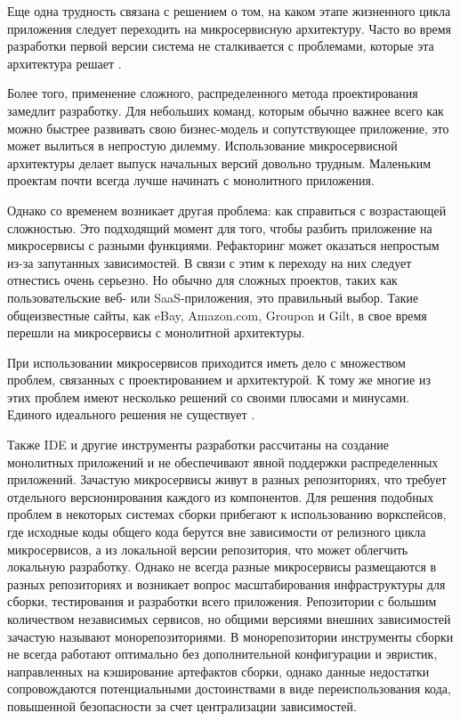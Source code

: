 Еще одна трудность связана с решением о том, на каком этапе жизненного цикла
приложения следует переходить на микросервисную архитектуру. Часто во время
разработки первой версии система не сталкивается с проблемами, которые эта
архитектура решает \cite{kaban}. 

Более того, применение сложного, распределенного метода
проектирования замедлит разработку. Для небольших команд, которым обычно важнее всего
как можно быстрее развивать свою бизнес-модель и сопутствующее приложение, это
может вылиться в непростую дилемму. Использование микросервисной архитектуры делает выпуск начальных версий довольно трудным. Маленьким проектам почти всегда
лучше начинать с монолитного приложения.

Однако со временем возникает другая проблема: как справиться с возрастающей сложностью. Это подходящий момент для того, чтобы разбить приложение
на микросервисы с разными функциями. Рефакторинг может оказаться непростым
из-за запутанных зависимостей. В связи с этим к переходу на них следует отнестись очень серьезно. Но обычно для сложных проектов, таких как пользовательские веб- или
SaaS-приложения, это правильный выбор. Такие общеизвестные сайты, как eBay, Amazon.com, Groupon и Gilt, в свое время перешли на микросервисы с монолитной архитектуры.

При использовании микросервисов приходится иметь дело с множеством проблем, связанных с проектированием и архитектурой.
К тому же многие из этих
проблем имеют несколько решений со своими плюсами и минусами. Единого
идеального решения не существует \cite{micro-1}.

Также IDE и другие инструменты разработки рассчитаны на создание монолитных
приложений и не обеспечивают явной поддержки распределенных приложений. Зачастую микросервисы живут в разных репозиториях, что
требует отдельного версионирования каждого из компонентов. Для решения подобных проблем в некоторых системах сборки прибегают к использованию
воркспейсов, где исходные коды общего кода берутся вне зависимости от релизного цикла микросервисов, а из локальной версии репозитория,
что может облегчить локальную разработку. Однако не всегда разные микросервисы размещаются в разных репозиториях и возникает вопрос
масштабирования инфраструктуры для сборки, тестирования и разработки всего приложения. Репозитории с большим количеством независимых сервисов, но
общими версиями внешних зависимостей зачастую называют монорепозиториями. В монорепозитории инструменты сборки не всегда работают оптимально
без дополнительной конфигурации и эвристик, направленных на кэширование артефактов сборки, однако данные недостатки сопровождаются потенциальными
достоинствами в виде переиспользования кода, повышенной безопасности за счет централизации зависимостей.

